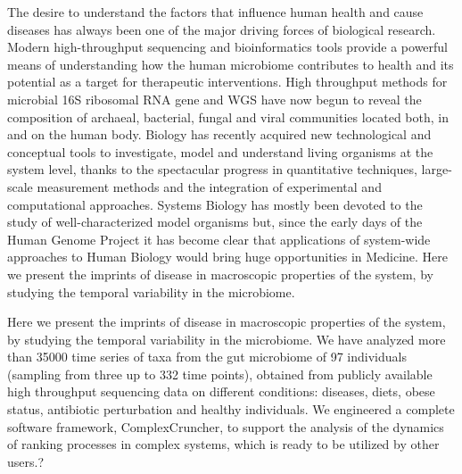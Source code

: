 The desire to understand the factors that influence human health and cause diseases has always been one of the major driving forces of biological research. Modern high-throughput sequencing and bioinformatics tools provide a powerful means of understanding how the human microbiome contributes to health and its potential as a target for therapeutic interventions. High throughput methods for microbial 16S ribosomal RNA gene and WGS have now begun to reveal the composition of archaeal, bacterial, fungal and viral communities located both, in and on the human body. Biology has recently acquired new technological and conceptual tools to investigate, model and understand living organisms at the system level, thanks to the spectacular progress in quantitative techniques, large-scale measurement methods and the integration of experimental and computational approaches. Systems Biology has mostly been devoted to the study of well-characterized model organisms but, since the early days of the Human Genome Project it has become clear that applications of system-wide approaches to Human Biology would bring huge opportunities in Medicine. Here we present the imprints of disease in macroscopic properties of the system, by studying the temporal variability in the microbiome.

Here we present the imprints of disease in macroscopic properties of the system, by studying the temporal variability in the microbiome. We have analyzed more than 35000 time series of taxa from the gut microbiome of 97 individuals (sampling from three up to 332 time points), obtained from publicly available high throughput sequencing data on different conditions: diseases, diets, obese status, antibiotic perturbation and healthy individuals. We engineered a complete software framework, ComplexCruncher, to support the analysis of the dynamics of ranking processes in complex systems, which is ready to be utilized by other users.?
